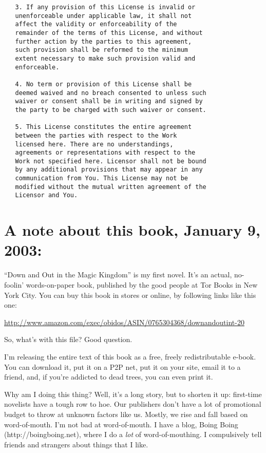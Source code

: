 \begin{verbatim}
   3. If any provision of this License is invalid or
   unenforceable under applicable law, it shall not
   affect the validity or enforceability of the
   remainder of the terms of this License, and without
   further action by the parties to this agreement,
   such provision shall be reformed to the minimum
   extent necessary to make such provision valid and
   enforceable.

   4. No term or provision of this License shall be
   deemed waived and no breach consented to unless such
   waiver or consent shall be in writing and signed by
   the party to be charged with such waiver or consent.

   5. This License constitutes the entire agreement
   between the parties with respect to the Work
   licensed here. There are no understandings,
   agreements or representations with respect to the
   Work not specified here. Licensor shall not be bound
   by any additional provisions that may appear in any
   communication from You. This License may not be
   modified without the mutual written agreement of the
   Licensor and You.
\end{verbatim}
\section{A note about this book, January 9, 2003:}

“Down and Out in the Magic Kingdom” is my first novel. It's an
actual, no-foolin' words-on-paper book, published by the good
people at Tor Books in New York City. You can buy this book in
stores or online, by following links like this one:

\href{http://www.amazon.com/exec/obidos/ASIN/0765304368/downandoutint-20}{http://www.amazon.com/exec/obidos/ASIN/0765304368/downandoutint-20}

So, what's with this file? Good question.

I'm releasing the entire text of this book as a free, freely
redistributable e-book. You can download it, put it on a P2P net,
put it on your site, email it to a friend, and, if you're addicted
to dead trees, you can even print it.

Why am I doing this thing? Well, it's a long story, but to shorten
it up: first-time novelists have a tough row to hoe. Our publishers
don't have a lot of promotional budget to throw at unknown factors
like us. Mostly, we rise and fall based on word-of-mouth. I'm not
bad at word-of-mouth. I have a blog, Boing Boing
(http://boingboing.net), where I do a \emph{lot} of
word-of-mouthing. I compulsively tell friends and strangers about
things that I like.


